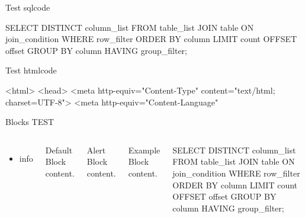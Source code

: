 \begin{frame}[fragile]{Test}
sqlcode  

\begin{sqlcode}
SELECT DISTINCT column_list
FROM table_list
    JOIN table ON join_condition
WHERE row_filter
ORDER BY column
LIMIT count OFFSET offset
GROUP BY column
HAVING group_filter;
\end{sqlcode}

\end{frame}


\begin{frame}[fragile]{Test}
htmlcode  

\begin{htmlcode}
<html>
<head>
<meta http-equiv="Content-Type" 
   content="text/html; charset=UTF-8">
<meta http-equiv="Content-Language" 
\end{htmlcode}

\end{frame}

\begin{frame}[fragile]{Blocks}
TEST
  \begin{columns}[T,onlytextwidth]
      \begin{itemize}
          \item info
      \end{itemize}
      
      \begin{block}{Default}
        Block content.
      \end{block}

      \begin{alertblock}{Alert}
        Block content.
      \end{alertblock}

      \begin{exampleblock}{Example}
        Block content.
      \end{exampleblock}

      \begin{greysql}
SELECT DISTINCT column_list
FROM table_list
    JOIN table ON join_condition
WHERE row_filter
ORDER BY column
LIMIT count OFFSET offset
GROUP BY column
HAVING group_filter;
\end{greysql}

  \end{columns}
\end{frame}

